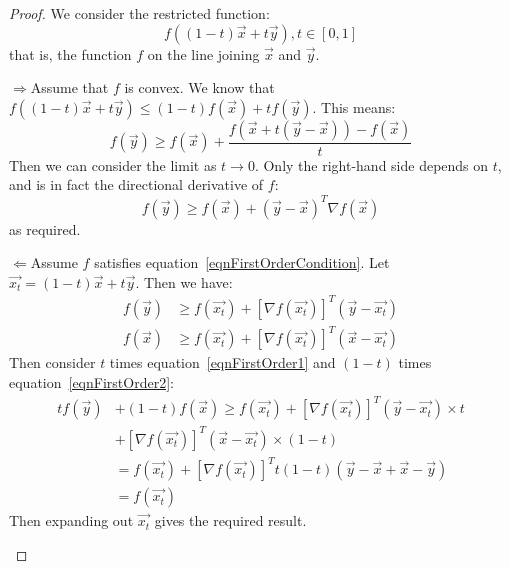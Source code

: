 \documentclass[../Main.tex]{subfiles}
\begin{document}
\begin{proof}
    We consider the restricted function:
    \begin{equation*}
        f((1-t)\vec{x} + t\vec{y}), t \in [0, 1]
    \end{equation*}
    that is, the function $f$ on the line joining $\vec{x}$ and $\vec{y}$.
    \begin{proofdirection}{$\Rightarrow$}{Assume that $f$ is convex.}
        We know that $f((1-t)\vec{x} + t\vec{y}) \leq (1-t)f(\vec{x}) + tf(\vec{y})$. This means:
        \begin{equation*}
            f(\vec{y}) \geq f(\vec{x}) + \frac{f(\vec{x} + t(\vec{y}-\vec{x})) - f(\vec{x})}{t}
        \end{equation*}
        Then we can consider the limit as $t \to 0$. Only the right-hand side depends on $t$, and is in fact the directional derivative of $f$:
        \begin{equation*}
            f(\vec{y}) \geq f(\vec{x}) + (\vec{y} - \vec{x})^T \nabla f(\vec{x})
        \end{equation*}
        as required.
    \end{proofdirection}
    \begin{proofdirection}{$\Leftarrow$}{Assume $f$ satisfies equation~\ref{eqnFirstOrderCondition}.}
        Let $\vec{x_t} = (1 - t)\vec{x} + t\vec{y}$. Then we have:
        \begin{align}
            f(\vec{y}) &\geq f(\vec{x_t}) + \left[\nabla f(\vec{x_t})\right]^T (\vec{y} - \vec{x_t}) \label{eqnFirstOrder1} \\
            f(\vec{x}) &\geq f(\vec{x_t}) + \left[\nabla f(\vec{x_t})\right]^T (\vec{x} - \vec{x_t}) \label{eqnFirstOrder2}
        \end{align}
        Then consider $t$ times equation~\ref{eqnFirstOrder1} and $(1-t)$ times equation~\ref{eqnFirstOrder2}:
        \begin{align*}
            tf(\vec{y}) &+ (1-t)f(\vec{x}) \geq f(\vec{x_t}) + \left[\nabla f(\vec{x_t})\right]^T (\vec{y} - \vec{x_t}) \times t \\
            &+ \left[\nabla f(\vec{x_t})\right]^T (\vec{x} - \vec{x_t}) \times (1-t) \\
            &= f(\vec{x_t}) + \left[\nabla f(\vec{x_t})\right]^T t(1-t)(\vec{y} - \vec{x} + \vec{x} - \vec{y}) \\
            &= f(\vec{x_t})
        \end{align*}
        Then expanding out $\vec{x_t}$ gives the required result.
    \end{proofdirection}
\end{proof}
\end{document}
